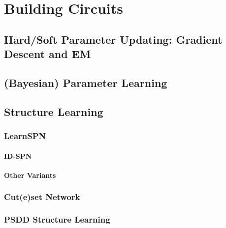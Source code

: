 	\section{Building Circuits} %

		\subsection{Hard/Soft Parameter Updating: Gradient Descent and EM} %

		\subsection{(Bayesian) Parameter Learning} %

		\subsection{Structure Learning} %

			\subsubsection{LearnSPN} %

				\paragraph{ID-SPN} %

				\paragraph{Other Variants} %

			\subsubsection{Cut(e)set Network} %

			\subsubsection{PSDD Structure Learning} %

